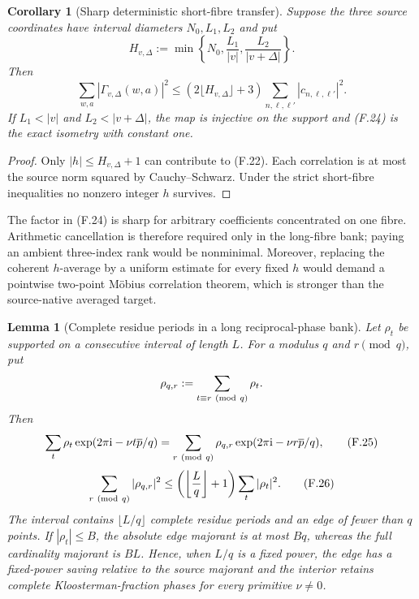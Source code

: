 \documentclass[11pt]{article}
\newtheorem{lemma}[theorem]{Lemma}
\newtheorem{corollary}[theorem]{Corollary}
\theoremstyle{definition}
\theoremstyle{remark}
\newcommand{\ee}[1]{\exp(2\pi\mathrm i #1)}
\begin{document}
\begin{corollary}[Sharp deterministic short-fibre transfer]
\label{cor:freq-short-fibre}
Suppose the three source coordinates have interval diameters $N_0,L_1,L_2$
and put
\[
 H_{v,\Delta}
 :=\min\left\{N_0,\frac{L_1}{|v|},
                    \frac{L_2}{|v+\Delta|}\right\}.
\]
Then
\[
 \boxed{
 \sum_{w,a}|\Gamma_{v,\Delta}(w,a)|^2
 \le(2\lfloor H_{v,\Delta}\rfloor+3)
     \sum_{n,\ell,\ell'}|c_{n,\ell,\ell'}|^2.}
 \tag{F.24}
\]
If $L_1<|v|$ and $L_2<|v+\Delta|$, the map is injective on the support and
\textup{(F.24)} is the exact isometry with constant one.
\end{corollary}

\begin{proof}
Only $|h|\le H_{v,\Delta}+1$ can contribute to \textup{(F.22)}.  Each
correlation is at most the source norm squared by Cauchy--Schwarz.  Under the
strict short-fibre inequalities no nonzero integer $h$ survives.
\end{proof}

The factor in \textup{(F.24)} is sharp for arbitrary coefficients concentrated
on one fibre.  Arithmetic cancellation is therefore required only in the
long-fibre bank; paying an ambient three-index rank would be nonminimal.
Moreover, replacing the coherent $h$-average by a uniform estimate for every
fixed $h$ would demand a pointwise two-point M\"obius correlation theorem,
which is stronger than the source-native averaged target.

\begin{lemma}[Complete residue periods in a long reciprocal-phase bank]
\label{lem:freq-complete-periods}
Let $\rho_t$ be supported on a consecutive interval of length $L$.  For a
modulus $q$ and $r\pmod q$, put
\[
 \rho_{q,r}:=\sum_{t\equiv r\ ({\rm mod}\ q)}\rho_t.
\]
Then
\[
 \sum_t\rho_t\ee{-\nu t\overline p/q}
 =\sum_{r\ ({\rm mod}\ q)}\rho_{q,r}
   \ee{-\nu r\overline p/q},
 \tag{F.25}
\]
\[
 \sum_{r\ ({\rm mod}\ q)}|\rho_{q,r}|^2
 \le\left(\left\lfloor\frac Lq\right\rfloor+1\right)
      \sum_t|\rho_t|^2.
 \tag{F.26}
\]
The interval contains $\lfloor L/q\rfloor$ complete residue periods and an
edge of fewer than $q$ points.  If $|\rho_t|\le B$, the absolute edge
majorant is at most $Bq$, whereas the full cardinality majorant is $BL$.
Hence, when $L/q$ is a fixed power, the edge has a fixed-power saving relative
to the source majorant and the interior retains complete
Kloosterman-fraction phases for every primitive $\nu\ne0$.
\end{lemma}
\end{document}
